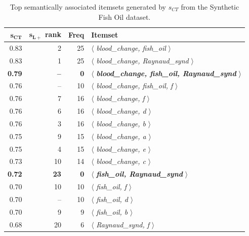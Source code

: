 \begin{table}
\begin{center}
\begin{tabular}{r |@{ } r |@{ } r | l }
  \hline
$\mathbf{s_{CT}}$  & $\mathbf{s_{L+}}$ rank    &\textbf{Freq}&   \textbf{Itemset}\\
  \hline\hline
0.83	&2&	25	&	$\langle$\emph{ blood\_change,	fish\_oil }$\rangle$\\
0.83	&1&	25	&	$\langle$\emph{ blood\_change,	Raynaud\_synd }$\rangle$\\
\textbf{0.79}	&\textbf{--}&	\textbf{0}	    &	$\langle$\emph{ \textbf{blood\_change,	fish\_oil,	Raynaud\_synd} }$\rangle$\\
0.76	&--&	10	&	$\langle$\emph{ blood\_change,	fish\_oil,	f }$\rangle$\\
0.76	&7&	16	&	$\langle$\emph{ blood\_change,	f }$\rangle$\\
0.76	&6&	16	&	$\langle$\emph{ blood\_change,	d }$\rangle$\\
0.76	&3&	16	&	$\langle$\emph{ blood\_change,	b }$\rangle$\\
0.75	&9&	15	&	$\langle$\emph{ blood\_change,	a }$\rangle$\\
0.75	&4&	15	&	$\langle$\emph{ blood\_change,	e }$\rangle$\\
0.73	&10&	14	&	$\langle$\emph{ blood\_change,	c }$\rangle$\\
\textbf{0.72}	&\textbf{23}&	\textbf{0}	    &	$\langle$\emph{ \textbf{fish\_oil,	Raynaud\_synd} }$\rangle$\\
0.70	&10&	10	&	$\langle$\emph{ fish\_oil,	f }$\rangle$\\
0.70	&--&	10	&	$\langle$\emph{ fish\_oil,	d }$\rangle$\\
0.70	&9&	9	&	$\langle$\emph{ fish\_oil,	b }$\rangle$\\
0.68	&20&	6   	&	$\langle$\emph{ Raynaud\_synd,	f }$\rangle$\\
  \hline
\end{tabular}
\end{center}
\caption{\label{tbl:syn} Top semantically associated itemsets generated by $s_{CT}$ from the Synthetic Fish Oil dataset.}
\end{table}


